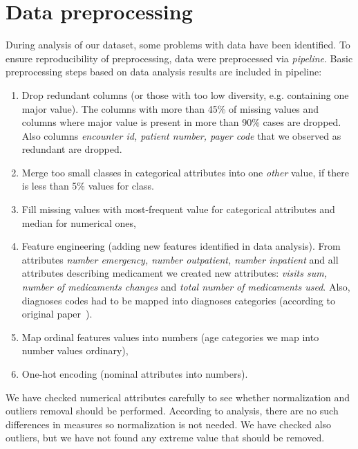 \documentclass[runningheads]{llncs}
\begin{document}
\section{Data preprocessing}

During analysis of our dataset, some problems with data have been identified. To ensure reproducibility of preprocessing, data were preprocessed via \textit{pipeline}. Basic preprocessing steps based on data analysis results are included in pipeline:
\begin{enumerate}
    \item Drop redundant columns (or those with too low diversity, e.g. containing one major value). The columns with more than 45\% of missing values and columns where major value is present in more than 90\% cases are dropped. Also columns \textit{encounter id, patient number, payer code} that we observed as redundant are dropped.
    
    \item Merge too small classes in categorical attributes into one \textit{other} value, if there is less than 5\% values for class. 
    
    \item Fill missing values with most-frequent value for categorical attributes and median for numerical ones,
    
    \item Feature engineering (adding new features identified in data analysis). From attributes \textit{number emergency, number outpatient, number inpatient} and all attributes describing medicament we created new attributes: \textit{visits sum, number of medicaments changes} and \textit{total number of medicaments used}. Also, diagnoses codes had to be mapped into diagnoses categories (according to original paper~\cite{Strack2014}).
    
    \item Map ordinal features values into numbers (age categories we map into number values ordinary), 
    
    \item One-hot encoding (nominal attributes into numbers).
\end{enumerate}{}

We have checked numerical attributes carefully to see whether normalization and outliers removal should be performed. According to analysis, there are no such differences in measures so normalization is not needed. We have checked also outliers, but we have not found any extreme value that should be removed.
\end{document}
